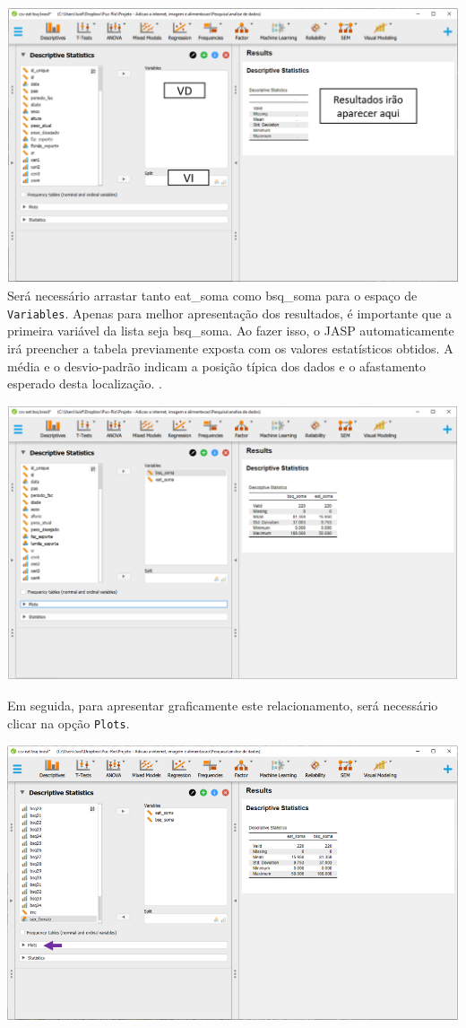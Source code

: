 \documentclass[
]{book}
\begin{document}
\includegraphics{./img/cap_correlacao_descritivo2.png} Será necessário
arrastar tanto eat\_soma como bsq\_soma para o espaço de
\texttt{Variables}. Apenas para melhor apresentação dos resultados, é
importante que a primeira variável da lista seja bsq\_soma. Ao fazer
isso, o JASP automaticamente irá preencher a tabela previamente exposta
com os valores estatísticos obtidos. A média e o desvio-padrão indicam a
posição típica dos dados e o afastamento esperado desta localização. .

\includegraphics{./img/cap_correlacao_descritivo3.png}

Em seguida, para apresentar graficamente este relacionamento, será
necessário clicar na opção \texttt{Plots}.

\includegraphics{./img/cap_correlacao_plot.png}
\end{document}
